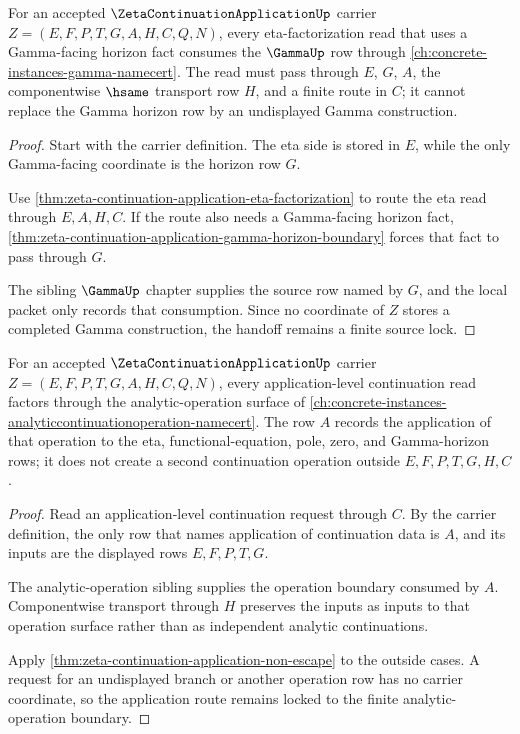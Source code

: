 \begin{theorem}
\label{thm:zeta-continuation-application-gamma-eta-handoff}
For an accepted $\ZetaContinuationApplicationUp$ carrier $Z=(E,F,P,T,G,A,H,C,Q,N)$, every eta-factorization read that uses a Gamma-facing horizon fact consumes the $\GammaUp$ row through \autoref{ch:concrete-instances-gamma-namecert}. The read must pass through $E$, $G$, $A$, the componentwise $\hsame$ transport row $H$, and a finite route in $C$; it cannot replace the Gamma horizon row by an undisplayed Gamma construction.
\end{theorem}
\begin{proof}
Start with the carrier definition. The eta side is stored in $E$, while the only Gamma-facing coordinate is the horizon row $G$.

Use \autoref{thm:zeta-continuation-application-eta-factorization} to route the eta read through $E,A,H,C$. If the route also needs a Gamma-facing horizon fact, \autoref{thm:zeta-continuation-application-gamma-horizon-boundary} forces that fact to pass through $G$.

The sibling $\GammaUp$ chapter supplies the source row named by $G$, and the local packet only records that consumption. Since no coordinate of $Z$ stores a completed Gamma construction, the handoff remains a finite source lock.
\end{proof}

\begin{theorem}
\label{thm:zeta-continuation-application-analytic-operation-boundary}
For an accepted $\ZetaContinuationApplicationUp$ carrier $Z=(E,F,P,T,G,A,H,C,Q,N)$, every application-level continuation read factors through the analytic-operation surface of \autoref{ch:concrete-instances-analyticcontinuationoperation-namecert}. The row $A$ records the application of that operation to the eta, functional-equation, pole, zero, and Gamma-horizon rows; it does not create a second continuation operation outside $E,F,P,T,G,H,C$.
\end{theorem}
\begin{proof}
Read an application-level continuation request through $C$. By the carrier definition, the only row that names application of continuation data is $A$, and its inputs are the displayed rows $E,F,P,T,G$.

The analytic-operation sibling supplies the operation boundary consumed by $A$. Componentwise transport through $H$ preserves the inputs as inputs to that operation surface rather than as independent analytic continuations.

Apply \autoref{thm:zeta-continuation-application-non-escape} to the outside cases. A request for an undisplayed branch or another operation row has no carrier coordinate, so the application route remains locked to the finite analytic-operation boundary.
\end{proof}

